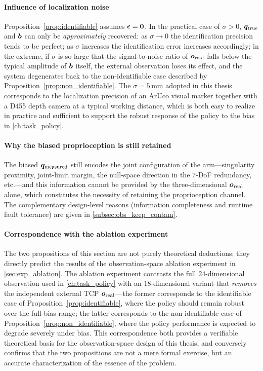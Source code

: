 \paragraph{Influence of localization noise} Proposition~\ref{prop:identifiable} assumes $\bm{\epsilon} = \bm{0}$. In the practical case of $\sigma > 0$, $\bm{q}_{\text{true}}$ and $\bm{b}$ can only be \emph{approximately} recovered: as $\sigma \to 0$ the identification precision tends to be perfect; as $\sigma$ increases the identification error increases accordingly; in the extreme, if $\sigma$ is so large that the signal-to-noise ratio of $\bm{o}_{\text{real}}$ falls below the typical amplitude of $\bm{b}$ itself, the external observation loses its effect, and the system degenerates back to the non-identifiable case described by Proposition~\ref{prop:non_identifiable}. The $\sigma = 5$\,mm adopted in this thesis corresponds to the localization precision of an ArUco visual marker together with a D455 depth camera at a typical working distance, which is both easy to realize in practice and sufficient to support the robust response of the policy to the bias in \cref{ch:task_policy}.

\paragraph{Why the biased proprioception is still retained} The biased $\bm{q}_{\text{measured}}$ still encodes the joint configuration of the arm---singularity proximity, joint-limit margin, the null-space direction in the $7$-DoF redundancy, etc.---and this information cannot be provided by the three-dimensional $\bm{o}_{\text{real}}$ alone, which constitutes the necessity of retaining the proprioception channel. The complementary design-level reasons (information completeness and runtime fault tolerance) are given in \cref{subsec:obs_keep_contam}.

\paragraph{Correspondence with the ablation experiment} The two propositions of this section are not purely theoretical deductions; they directly predict the results of the observation-space ablation experiment in \cref{sec:exp_ablation}. The ablation experiment contrasts the full $24$-dimensional observation used in \cref{ch:task_policy} with an $18$-dimensional variant that \emph{removes} the independent external TCP $\bm{o}_\text{real}$---the former corresponds to the identifiable case of Proposition~\ref{prop:identifiable}, where the policy should remain robust over the full bias range; the latter corresponds to the non-identifiable case of Proposition~\ref{prop:non_identifiable}, where the policy performance is expected to degrade severely under bias. This correspondence both provides a verifiable theoretical basis for the observation-space design of this thesis, and conversely confirms that the two propositions are not a mere formal exercise, but an accurate characterization of the essence of the problem.

